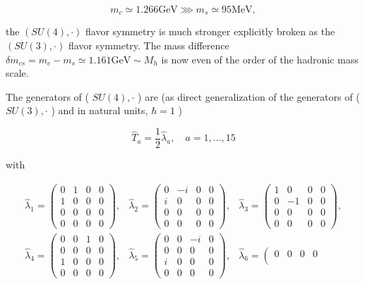 \documentclass[10pt, letterpaper]{article}
\begin{document}
$$
m_{c} \simeq 1.266 \mathrm{GeV} \ggg m_{s} \simeq 95 \mathrm{MeV},
$$

the $(S U(4), \cdot)$ flavor symmetry is much stronger explicitly broken as the $(S U(3), \cdot)$ flavor symmetry. The mass difference $\delta m_{c s}=m_{c}-m_{s} \simeq 1.161 \mathrm{GeV} \sim M_{h}$ is now even of the order of the hadronic mass scale.

The generators of ( $S U(4), \cdot$ ) are (as direct generalization of the generators of ( $S U(3), \cdot$ ) and in natural units, $\hbar=1$ )

$$
\hat{T}_{a}=\frac{1}{2} \hat{\lambda}_{a}, \quad a=1, \ldots, 15
$$

with

$$
\begin{array}{lll}
\hat{\lambda}_{1}=\left(\begin{array}{cccc}
0 & 1 & 0 & 0 \\
1 & 0 & 0 & 0 \\
0 & 0 & 0 & 0 \\
0 & 0 & 0 & 0
\end{array}\right), & \hat{\lambda}_{2}=\left(\begin{array}{cccc}
0 & -i & 0 & 0 \\
i & 0 & 0 & 0 \\
0 & 0 & 0 & 0 \\
0 & 0 & 0 & 0
\end{array}\right), & \hat{\lambda}_{3}=\left(\begin{array}{cccc}
1 & 0 & 0 & 0 \\
0 & -1 & 0 & 0 \\
0 & 0 & 0 & 0 \\
0 & 0 & 0 & 0
\end{array}\right), \\
\hat{\lambda}_{4}=\left(\begin{array}{llll}
0 & 0 & 1 & 0 \\
0 & 0 & 0 & 0 \\
1 & 0 & 0 & 0 \\
0 & 0 & 0 & 0
\end{array}\right), & \hat{\lambda}_{5}=\left(\begin{array}{cccc}
0 & 0 & -i & 0 \\
0 & 0 & 0 & 0 \\
i & 0 & 0 & 0 \\
0 & 0 & 0 & 0
\end{array}\right), & \hat{\lambda}_{6}=\left(\begin{array}{llll}
0 & 0 & 0 & 0 \\

\end{array}
\end{array}$$
\end{document}
